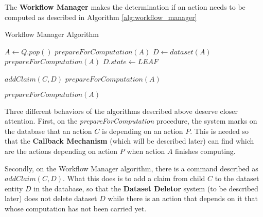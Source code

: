 The \textbf{Workflow Manager} makes the determination if an action needs to be computed as described in Algorithm \ref{alg:workflow_manager}

\begin{algorithm}
\begin{singlespace}
\caption{Workflow Manager Algorithm}
\label{alg:workflow_manager}
\begin{algorithmic}[1]
\State $A \gets Q.pop()$ 
	\State $prepareForComputation(A)$
\Else
	\State $D \gets dataset(A)$ 
		\State $prepareForComputation(A)$
	\Else
				\State $D.state \gets LEAF$ 
				
			\EndIf
			
					\State $addClaim(C, D)$ 		
						\State $prepareForComputation(A)$
					\EndIf
				\EndIf
			
			\EndFor
		\Else
				\State $prepareForComputation(A)$
			\EndIf
		\EndIf
	\EndIf
\EndIf
\EndProcedure
\end{algorithmic}
\end{singlespace}
\end{algorithm}

Three different behaviors of the algorithms described above deserve closer attention. First, on the \textit{prepareForComputation} procedure, the system marks on the database that an action $C$ is depending on an action $P$. This is needed so that the \textbf{Callback Mechanism} (which will be described later) can find which are the actions depending on action $P$ when action $A$ finishes computing.

Secondly, on the Workflow Manager algorithm, there is a command described as $addClaim(C, D)$. What this does is to add a claim from child $C$ to the dataset entity $D$ in the database, so that the \textbf{Dataset Deletor} system (to be described later) does not delete dataset $D$ while there is an action that depends on it that whose computation has not been carried yet.


